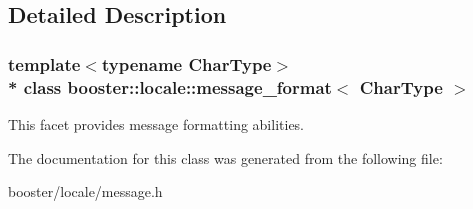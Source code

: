 \subsection{Detailed Description}
\subsubsection*{template$<$typename Char\+Type$>$\\*
class booster\+::locale\+::message\+\_\+format$<$ Char\+Type $>$}

This facet provides message formatting abilities. 

The documentation for this class was generated from the following file\+:\begin{DoxyCompactItemize}
\item 
booster/locale/message.\+h\end{DoxyCompactItemize}
